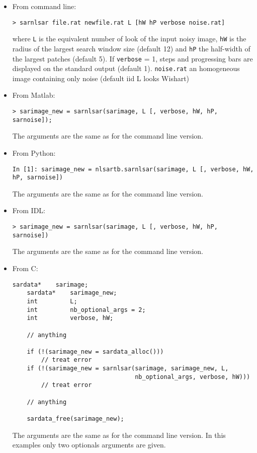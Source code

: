 \documentclass[10pt,french,english,a4paper]{article}
\begin{document}
\begin{itemize}
\item From command line:
  \begin{Verbatim}[frame=single]
    > sarnlsar file.rat newfile.rat L [hW hP verbose noise.rat]
  \end{Verbatim}
  where \texttt{L} is the equivalent number of look of the input noisy image,
  \texttt{hW} is the radius of the largest search window size (default 12) and
  \texttt{hP} the half-width of the largest patches (default 5).
  If \texttt{verbose} = 1, steps and progressing bars are displayed on the standard output (default 1).
  \texttt{noise.rat} an homogeneous image containing only noise (default iid L looks Wishart)
\item From Matlab:
  \begin{Verbatim}[frame=single]
    > sarimage_new = sarnlsar(sarimage, L [, verbose, hW, hP, sarnoise]);
  \end{Verbatim}
  The arguments are the same as for the command line version.
\item From Python:
  \begin{Verbatim}[frame=single]
    In [1]: sarimage_new = nlsartb.sarnlsar(sarimage, L [, verbose, hW, hP, sarnoise])

  \end{Verbatim}
  The arguments are the same as for the command line version.
\item From IDL:
  \begin{Verbatim}[frame=single]
    > sarimage_new = sarnlsar(sarimage, L [, verbose, hW, hP, sarnoise])
  \end{Verbatim}
  The arguments are the same as for the command line version.
\item From C:
  \begin{Verbatim}[frame=single]
    sardata*    sarimage;
    sardata*    sarimage_new;
    int         L;
    int         nb_optional_args = 2;
    int         verbose, hW;

    // anything

    if (!(sarimage_new = sardata_alloc()))
        // treat error
    if (!(sarimage_new = sarnlsar(sarimage, sarimage_new, L,
                                  nb_optional_args, verbose, hW)))
        // treat error

    // anything

    sardata_free(sarimage_new);
  \end{Verbatim}
  The arguments are the same as for the command line version.
  In this examples only two optionals arguments are given.
\end{itemize}
\end{document}
